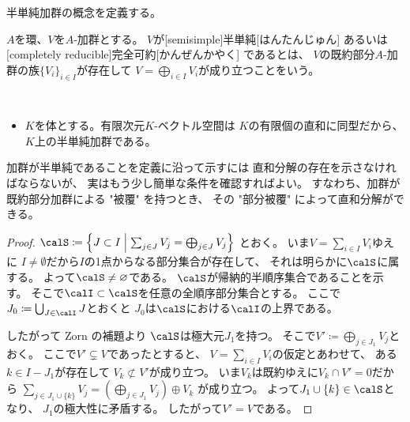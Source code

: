 \documentclass[report]{jlreq}
\begin{document}
半単純加群の概念を定義する。

\begin{definition}[半単純加群]
    $A$を環、$V$を$A$-加群とする。
    $V$が[semisimple]{半単純}[はんたんじゅん]
    あるいは
    [completely reducible]{完全可約}[かんぜんかやく]
    であるとは、
    $V$の既約部分$A$-加群の族$\{ V_i \}_{i \in I}$が存在して
    $V = \bigoplus_{i \in I} V_i$が成り立つことをいう。
\end{definition}

\begin{example}[半単純加群の例]
    ~
    \begin{itemize}
        \item $K$を体とする。有限次元$K$-ベクトル空間は
            $K$の有限個の直和に同型だから、
            $K$上の半単純加群である。
    \end{itemize}
\end{example}

加群が半単純であることを定義に沿って示すには
直和分解の存在を示さなければならないが、
実はもう少し簡単な条件を確認すればよい。
すなわち、加群が既約部分加群による "被覆" を持つとき、
その "部分被覆" によって直和分解ができる。


\begin{proof}
    $\calS \coloneqq
        \left\{
            J \subset I
            \; \middle| \;
            \sum_{j \in J} V_j = \bigoplus_{j \in J} V_j
        \right\}$
    とおく。
    いま$V = \sum_{i \in I} V_i$ゆえに
    $I \neq \emptyset$だから$I$の1点からなる部分集合が存在して、
    それは明らかに$\calS$に属する。
    よって$\calS \neq \emptyset$である。
    $\calS$が帰納的半順序集合であることを示す。
    そこで$\calI \subset \calS$を任意の全順序部分集合とする。
    ここで$J_0 \coloneqq \bigcup_{J \in \calI} J$とおくと
    $J_0$は$\calS$における$\calI$の上界である。
    \begin{innerproof}
        \TODO{}
    \end{innerproof}
    したがって Zorn の補題より
    $\calS$は極大元$J_1$を持つ。
    そこで$V' \coloneqq \bigoplus_{j \in J_1} V_j$とおく。
    ここで$V' \subsetneq V$であったとすると、
    $V = \sum_{i \in I} V_i$の仮定とあわせて、
    ある$k \in I - J_1$が存在して
    $V_k \not\subset V'$が成り立つ。
    いま$V_k$は既約ゆえに$V_k \cap V' = 0$だから
    $\sum_{j \in J_1 \cup \{ k \}} V_j
        = \left( \bigoplus_{j \in J_1} V_j \right) \oplus V_k$
    が成り立つ。
    よって$J_1 \cup \{ k \} \in \calS$となり、
    $J_1$の極大性に矛盾する。
    したがって$V' = V$である。
\end{proof}
\end{document}
